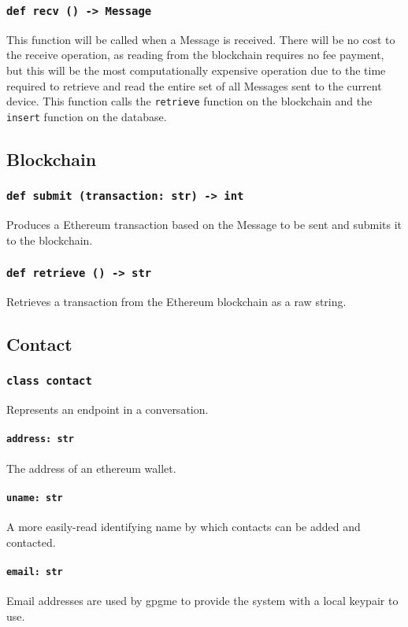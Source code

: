 \documentclass[]{article}
\begin{document}
\subsubsection{\texttt{def recv () -> Message}}
This function will be called when a Message is received. There will be no cost to the receive operation, as reading from the blockchain requires no fee payment, but this will be the most computationally expensive operation due to the time required to retrieve and read the entire set of all Messages sent to the current device. This function calls the \texttt{retrieve} function on the blockchain and the \texttt{insert} function on the database.

\subsection{Blockchain}
\subsubsection{\texttt{def submit (transaction: str) -> int}}
Produces a Ethereum transaction based on the Message to be sent and submits it to the blockchain.
\subsubsection{\texttt{def retrieve () -> str}}
Retrieves a transaction from the Ethereum blockchain as a raw string.

\subsection{Contact}
\subsubsection{\texttt{class contact}}
Represents an endpoint in a conversation.
\paragraph{\texttt{address: str}}
The address of an ethereum wallet.
\paragraph{\texttt{uname: str}}
A more easily-read identifying name by which contacts can be added and contacted.
\paragraph{\texttt{email: str}}
Email addresses are used by gpgme to provide the system with a local keypair to use.
\end{document}
